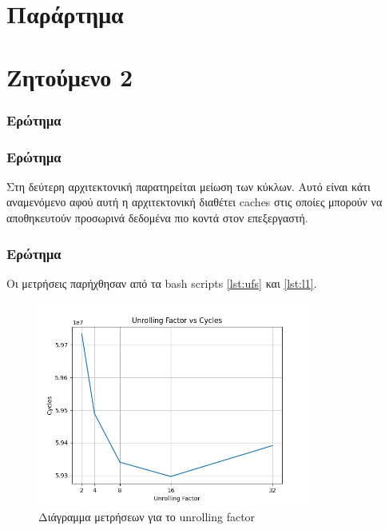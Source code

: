 \documentclass{article}
\newcommand{\eng}[1]{\foreignlanguage{english}{#1}} %
\begin{document}
\clearpage
\part{Παράρτημα}


\clearpage
\setcounter{section}{0}
\part{Ζητούμενο 2}

\section{Ερώτημα}

\begin{figure}[h]
    
\end{figure}

\section{Ερώτημα}

\begin{figure}[h]
    
\end{figure}

Στη δεύτερη αρχιτεκτονική παρατηρείται μείωση των κύκλων. Αυτό είναι κάτι αναμενόμενο αφού αυτή η αρχιτεκτονική διαθέτει \eng{caches} στις οποίες μπορούν να αποθηκευτούν προσωρινά δεδομένα πιο κοντά στον επεξεργαστή.

\section{Ερώτημα}

Οι μετρήσεις παρήχθησαν από τα \eng{bash scripts} \ref{lst:ufs} και \ref{lst:l1}.

\begin{figure}[h]
    \centering
    \includegraphics[width=0.8\textwidth]{./plots/unrolling-factor.png}
    \caption{Διάγραμμα μετρήσεων για το \eng{unrolling factor}}
    \label{fig:ufs}
\end{figure}
\FloatBarrier
\end{document}
